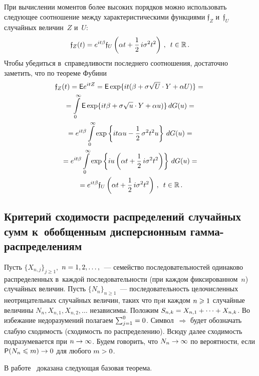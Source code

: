 \begin{multicols}{2}
При вычислении моментов более высоких порядков можно использовать
следующее соотношение между характеристическими функциями
$\mathfrak{f}_Z$ и~$\mathfrak{f}_U$ случайных величин~$Z$ и~$U$:
$$
\mathfrak{f}_Z(t)=e^{it\beta}\mathfrak{f}_U\left(\alpha
t+\displaystyle\frac{\displaystyle 1\mathstrut}{\displaystyle 2\mathstrut}\,i\sigma^2t^2\right)\,,\enskip t\in\mathbb{R}\,.
$$
Чтобы убедиться в~справедливости последнего соотношения, достаточно
заметить, что по теореме Фубини
\begin{multline*}
\mathfrak{f}_Z(t)={\sf E}e^{itZ}={\sf
E}\exp\{it(\beta+\sigma\sqrt{U}\cdot Y+\alpha
U)\}={}\\
{}=\int\limits_{0}^{\infty}{\sf E}\exp\{it\beta+\sigma\sqrt{u}\cdot
Y+\alpha u)\}\,dG(u)={}
\\
{}=e^{it\beta}\int\limits_{0}^{\infty}\exp\left\{it\alpha u-
\displaystyle\frac{\displaystyle 1\mathstrut}{\displaystyle 2\mathstrut}\,\sigma^2t^2u\right\}\,dG(u)={}\\
{}=e^{it\beta}\int\limits_{0}^{\infty}\exp\left\{iu\left(\alpha t+
\displaystyle\frac{\displaystyle 1\mathstrut}{\displaystyle 2\mathstrut}\,i\sigma^2t^2\right)\right\}\,dG(u)={}
\\
{}=e^{it\beta}\mathfrak{f}_U\left(\alpha
t+\displaystyle\frac{\displaystyle 1\mathstrut}{\displaystyle 2\mathstrut}\,i\sigma^2t^2\right)\,,\enskip t\in\mathbb{R}\,.
\end{multline*}


\subsection{Критерий сходимости распределений случайных сумм 
к~обобщенным дисперсионным гамма-распределениям}

Пусть $\{X_{n,j}\}_{j\geqslant1},$ $n\hm=1,2,\ldots,$~--- семейство
последовательностей одинаково распределенных в~каж\-дой
последовательности (при каждом фиксированном~$n$) случайных величин.
Пусть $\{N_n\}_{n\geqslant1}$~--- последовательность целочисленных
неотрицательных случайных величин, таких что пpи каждом $n\hm\geqslant1$
случайные величины $N_n,X_{n,1},X_{n,2},\ldots$ независимы. Положим
$S_{n,k}\hm=X_{n,1}+\cdots +X_{n,k}$. Во избежание недоразумений
полагаем $\sum_{j=1}^0\hm=0$. Символ~$\Longrightarrow$ будет обозначать
слабую сходимость (сходимость по распределению). Всюду далее
сходимость подразумевается при $n\hm\to\infty$. Будем говорить, что
$N_n\hm\to\infty$ по вероятности, если ${\sf P}(N_n\hm\leqslant m)\hm\to 0$ для
любого $m\hm>0$.

В работе~\cite{Korolev2013} доказана следующая базовая теорема.

\smallskip


\end{multicols}
